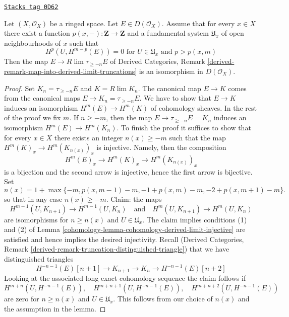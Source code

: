 \begin{lemma}
\label{cohomology-lemma-is-limit-per-point}
\href{https://stacks.math.columbia.edu/tag/0D62}{\texttt{Stacks tag 0D62}}

Let $(X, \mathcal{O}_X)$ be a ringed space. Let $E \in D(\mathcal{O}_X)$.
Assume that for every $x \in X$ there exist
a function $p(x, -) : \mathbf{Z} \to \mathbf{Z}$ and
a fundamental system $\mathfrak{U}_x$ of open neighbourhoods of $x$
such that
$$
H^p(U, H^{m - p}(E)) = 0 \text{ for }
U \in \mathfrak{U}_x \text{ and } p > p(x, m)
$$
Then the map $E \to R\lim \tau_{\geq -n} E$ of
Derived Categories, Remark
\ref{derived-remark-map-into-derived-limit-truncations}
is an isomorphism in $D(\mathcal{O}_X)$.
\end{lemma}

\begin{proof}

Set $K_n = \tau_{\geq -n}E$ and $K = R\lim K_n$.
The canonical map $E \to K$
comes from the canonical maps $E \to K_n = \tau_{\geq -n}E$.
We have to show that $E \to K$ induces an isomorphism
$H^m(E) \to H^m(K)$ of cohomology sheaves. In the rest of the
proof we fix $m$. If $n \geq -m$, then
the map $E \to \tau_{\geq -n}E = K_n$ induces an isomorphism
$H^m(E) \to H^m(K_n)$.
To finish the proof it suffices to show that for every $x \in X$
there exists an integer $n(x) \geq -m$ such that the map
$H^m(K)_x \to H^m(K_{n(x)})_x$ is injective. Namely, then
the composition
$$
H^m(E)_x \to H^m(K)_x \to H^m(K_{n(x)})_x
$$
is a bijection and the second arrow is injective, hence the
first arrow is bijective. Set
$$
n(x) = 1 + \max\{-m, p(x, m - 1) - m, -1 + p(x, m) - m, -2 + p(x, m + 1) - m\}.
$$
so that in any case $n(x) \geq -m$. Claim: the maps
$$
H^{m - 1}(U, K_{n + 1}) \to H^{m - 1}(U, K_n)
\quad\text{and}\quad
H^m(U, K_{n + 1}) \to H^m(U, K_n)
$$
are isomorphisms for $n \geq n(x)$ and $U \in \mathfrak{U}_x$.
The claim implies conditions
(1) and (2) of Lemma \ref{cohomology-lemma-cohomology-derived-limit-injective}
are satisfied and hence implies the desired injectivity.
Recall (Derived Categories, Remark
\ref{derived-remark-truncation-distinguished-triangle})
that we have distinguished triangles
$$
H^{-n - 1}(E)[n + 1] \to
K_{n + 1} \to K_n \to H^{-n - 1}(E)[n + 2]
$$
Looking at the associated long exact cohomology sequence the claim follows if
$$
H^{m + n}(U, H^{-n - 1}(E)),\quad
H^{m + n + 1}(U, H^{-n - 1}(E)),\quad
H^{m + n + 2}(U, H^{-n - 1}(E))
$$
are zero for $n \geq n(x)$ and $U \in \mathfrak{U}_x$.
This follows from our choice of $n(x)$
and the assumption in the lemma.
\end{proof}

